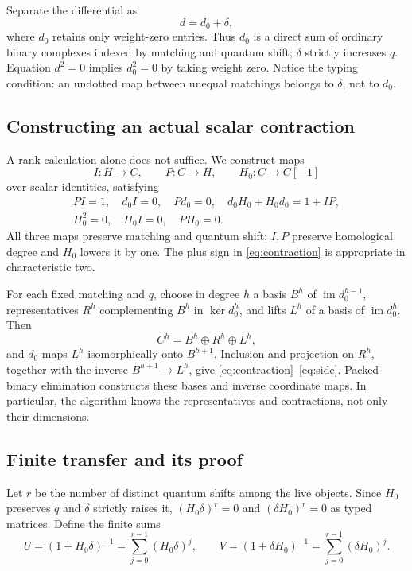 \documentclass[11pt]{article}
\theoremstyle{definition}
\theoremstyle{remark}
\newcommand{\im}{\operatorname{im}}
\begin{document}
Separate the differential as
\[
 d=d_0+\delta,
\]
where $d_0$ retains only weight-zero entries. Thus $d_0$ is a direct sum of ordinary binary complexes indexed by matching and quantum shift; $\delta$ strictly increases $q$. Equation $d^2=0$ implies $d_0^2=0$ by taking weight zero. Notice the typing condition: an undotted map between unequal matchings belongs to $\delta$, not to $d_0$.

\subsection{Constructing an actual scalar contraction}
A rank calculation alone does not suffice. We construct maps
\[
 I:H\longrightarrow C,\qquad P:C\longrightarrow H,\qquad
 H_0:C\longrightarrow C[-1]
\]
over scalar identities, satisfying
\begin{gather}
 PI=1,\quad d_0I=0,\quad Pd_0=0,\quad
 d_0H_0+H_0d_0=1+IP,\label{eq:contraction}\\
 H_0^2=0,\quad H_0I=0,\quad PH_0=0.\label{eq:side}
\end{gather}
All three maps preserve matching and quantum shift; $I,P$ preserve homological degree and $H_0$ lowers it by one. The plus sign in \eqref{eq:contraction} is appropriate in characteristic two.

For each fixed matching and $q$, choose in degree $h$ a basis $B^h$ of $\im d_0^{h-1}$, representatives $R^h$ complementing $B^h$ in $\ker d_0^h$, and lifts $L^h$ of a basis of $\im d_0^h$. Then
\[
 C^h=B^h\oplus R^h\oplus L^h,
\]
and $d_0$ maps $L^h$ isomorphically onto $B^{h+1}$. Inclusion and projection on $R^h$, together with the inverse $B^{h+1}\to L^h$, give \eqref{eq:contraction}--\eqref{eq:side}. Packed binary elimination constructs these bases and inverse coordinate maps. In particular, the algorithm knows the representatives and contractions, not only their dimensions.

\subsection{Finite transfer and its proof}
Let $r$ be the number of distinct quantum shifts among the live objects. Since $H_0$ preserves $q$ and $\delta$ strictly raises it, $(H_0\delta)^r=0$ and $(\delta H_0)^r=0$ as typed matrices. Define the finite sums
\[
 U=(1+H_0\delta)^{-1}=\sum_{j=0}^{r-1}(H_0\delta)^j,
 \qquad V=(1+\delta H_0)^{-1}=\sum_{j=0}^{r-1}(\delta H_0)^j.
\]
\end{document}
